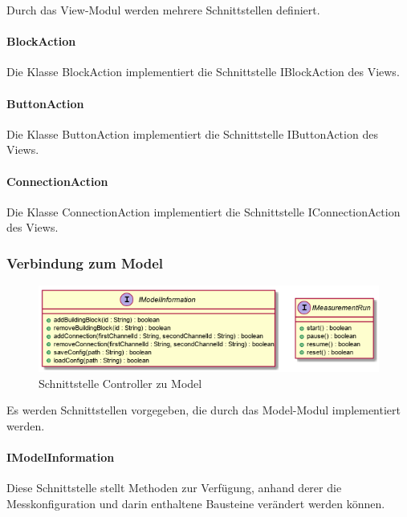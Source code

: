 \documentclass[parskip=full]{scrartcl}
\begin{document}
Durch das View-Modul werden mehrere Schnittstellen definiert.

\paragraph{BlockAction} Die Klasse BlockAction implementiert die Schnittstelle IBlockAction des Views.

\paragraph{ButtonAction} Die Klasse ButtonAction implementiert die Schnittstelle IButtonAction des Views.

\paragraph{ConnectionAction} Die Klasse ConnectionAction implementiert die Schnittstelle IConnectionAction des Views.

\subsubsection{Verbindung zum Model}

\begin{figure}[htbp]
	\begin{center}
		\includegraphics[width = 14cm]{Grafiken/Controller_Model_Interface.png}
		\caption{Schnittstelle Controller zu Model}
		\label{Controller_Model_Interface}
	\end{center}
\end{figure}

Es werden Schnittstellen vorgegeben, die durch das Model-Modul implementiert werden.

\paragraph{IModelInformation}

Diese Schnittstelle stellt Methoden zur Verfügung, anhand derer die Messkonfiguration und darin enthaltene Bausteine verändert werden können.
\end{document}
